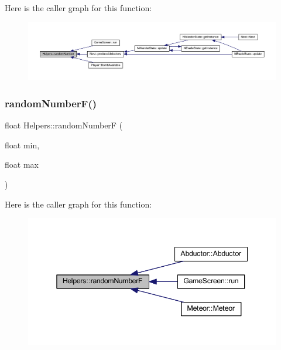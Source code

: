Here is the caller graph for this function\+:
\nopagebreak
\begin{figure}[H]
\begin{center}
\leavevmode
\includegraphics[width=350pt]{namespace_helpers_af4d3e03c8af50c930d3164b155f02e98_icgraph}
\end{center}
\end{figure}
\mbox{\label{namespace_helpers_ad1aef5710c67da43b9bbed2107c1e11b}} 
\subsubsection{\texorpdfstring{random\+Number\+F()}{randomNumberF()}}
{\footnotesize\ttfamily float Helpers\+::random\+NumberF (\begin{DoxyParamCaption}\item[{float}]{min,  }\item[{float}]{max }\end{DoxyParamCaption})\hspace{0.3cm}{\ttfamily [inline]}}

Here is the caller graph for this function\+:
\nopagebreak
\begin{figure}[H]
\begin{center}
\leavevmode
\includegraphics[width=345pt]{namespace_helpers_ad1aef5710c67da43b9bbed2107c1e11b_icgraph}
\end{center}
\end{figure}
